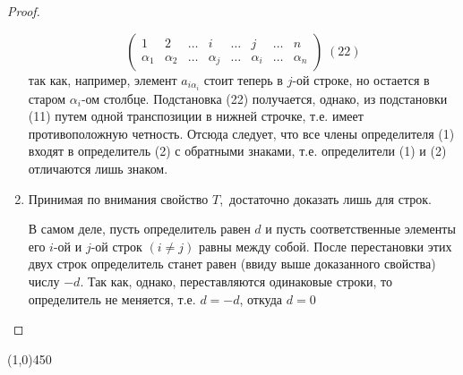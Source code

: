 \documentclass[a4paper,12pt]{article}
\begin{document}
\begin{proof}
\begin{enumerate}
\[\begin{pmatrix}
			1 & 2 & \ldots & i & \ldots & j & \ldots & n\\
			\alpha_1 & \alpha_2 & \ldots & \alpha_j & \ldots & \alpha_i & \ldots  & \alpha_n
			\end{pmatrix} \; (22)
			\]
			так как, например, элемент $a_{i\alpha_i}$ стоит теперь в $j$-ой строке, но остается в старом $\alpha_i$-ом столбце. Подстановка (22) получается, однако, из подстановки (11) путем одной транспозиции в нижней строчке, т.е. имеет противоположную четность. Отсюда следует, что все члены определителя (1) входят в определитель (2) с обратными знаками, т.е. определители (1) и (2) отличаются лишь знаком.
			\item Принимая по внимания свойство $T$,\ достаточно доказать лишь для строк.
			
			В самом деле, пусть определитель равен $d$ и пусть соответственные элементы его $i$-ой и $j$-ой строк $(i \neq j)$ равны между собой. После перестановки этих двух строк определитель станет равен (ввиду выше доказанного свойства) числу $-d$. Так как, однако, переставляются одинаковые строки, то определитель не меняется, т.е. $d = -d$, откуда $d = 0$ 
		\end{enumerate}
	\end{proof}
	\begin{center}
		\line(1,0){450}
	\end{center}
\end{document}
